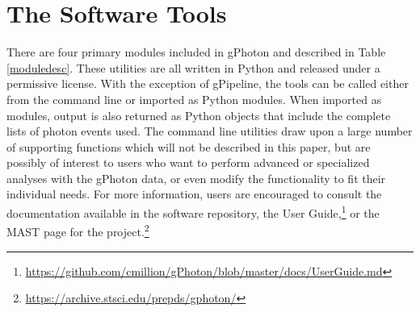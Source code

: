 \documentclass[trackchanges,preprint2]{aastex}
\begin{document}
\section{The Software Tools}
\label{softwaretools}
There are four primary modules included in gPhoton and described in Table \ref{moduledesc}. These utilities are all written in Python and released under a permissive license. With the exception of gPipeline, the tools can be called either from the command line or imported as Python modules. When imported as modules, output is also returned as Python objects that include the complete lists of photon events used. The command line utilities draw upon a large number of supporting functions which will not be described in this paper, but are possibly of interest to users who want to perform advanced or specialized analyses with the gPhoton data, or even modify the functionality to fit their individual needs. For more information, users are encouraged to consult the documentation available in the software repository, the User Guide,\footnote{\url{https://github.com/cmillion/gPhoton/blob/master/docs/UserGuide.md}} or the MAST page for the project.\footnote{\url{https://archive.stsci.edu/prepds/gphoton/}}
\end{document}
